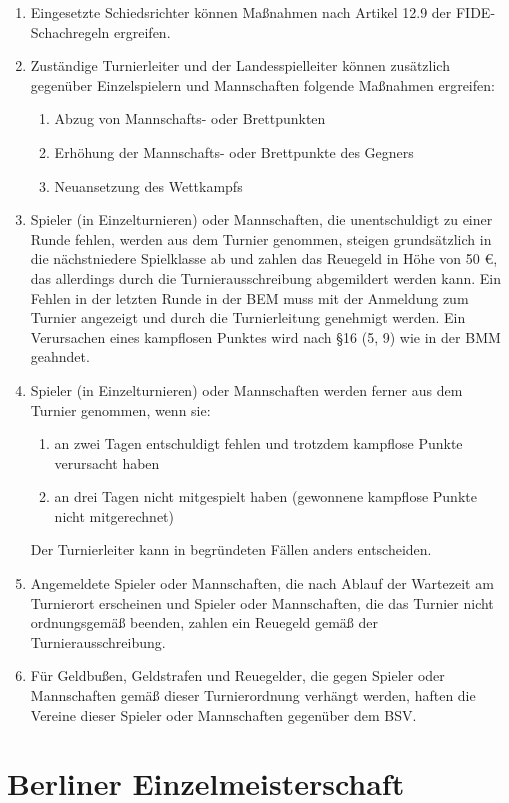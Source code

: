 \documentclass[fontsize=12pt, paper=a4, ngerman]{article}
\begin{document}
\begin{enumerate}
\item Eingesetzte Schiedsrichter können Maßnahmen nach Artikel 12.9 der FIDE-Schachregeln ergreifen.
\item Zuständige Turnierleiter und der Landesspielleiter können zusätzlich gegenüber Einzelspielern und Mannschaften folgende Maßnahmen ergreifen:
  \begin{enumerate}[label=\alph*.]
  \item Abzug von Mannschafts- oder Brettpunkten
  \item Erhöhung der Mannschafts- oder Brettpunkte des Gegners
  \item Neuansetzung des Wettkampfs
  \end{enumerate}
\item Spieler (in Einzelturnieren) oder Mannschaften, die unentschuldigt zu einer Runde fehlen, werden aus dem Turnier genommen, steigen grundsätzlich in die nächstniedere
Spielklasse ab und zahlen das Reuegeld in Höhe von 50 €, das allerdings durch die Turnierausschreibung abgemildert werden kann. Ein Fehlen
in der letzten Runde in der BEM muss mit der Anmeldung zum Turnier angezeigt und durch die Turnierleitung genehmigt werden. Ein Verursachen eines kampflosen Punktes
wird nach §16 (5, 9) wie in der BMM geahndet.  %
\item Spieler (in Einzelturnieren) oder Mannschaften werden ferner aus dem Turnier genommen, wenn sie:
  \begin{enumerate}[label=\alph*.]
  \item an zwei Tagen entschuldigt fehlen und trotzdem kampflose Punkte verursacht haben
  \item an drei Tagen nicht mitgespielt haben (gewonnene kampflose Punkte nicht mitgerechnet)
  \end{enumerate}
Der Turnierleiter kann in begründeten Fällen anders entscheiden.
\item Angemeldete Spieler oder Mannschaften, die nach Ablauf der Wartezeit am Turnierort erscheinen und Spieler oder Mannschaften, die das Turnier nicht ordnungsgemäß
beenden, zahlen ein Reuegeld gemäß der Turnierausschreibung.
\item Für Geldbußen, Geldstrafen und Reuegelder, die gegen Spieler oder Mannschaften gemäß dieser Turnierordnung verhängt werden, haften die Vereine dieser Spieler
oder Mannschaften gegenüber dem BSV.
\end{enumerate}

\section{Berliner Einzelmeisterschaft}
\end{document}
